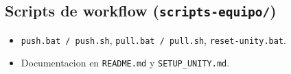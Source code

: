 \documentclass[12pt,a4paper]{article}
\begin{document}
\subsection*{Scripts de workflow (\texttt{scripts-equipo/})}

\begin{itemize}[leftmargin=1.5em]
    \item \texttt{push.bat / push.sh}, \texttt{pull.bat / pull.sh}, \texttt{reset-unity.bat}.
    \item Documentacion en \texttt{README.md} y \texttt{SETUP\_UNITY.md}.
\end{itemize}
\end{document}
